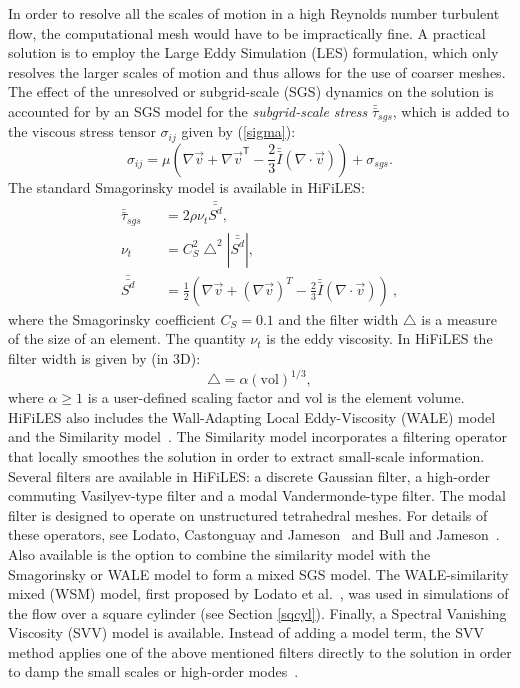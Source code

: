 In order to resolve all the scales of motion in a high Reynolds number turbulent flow, the computational mesh would have to be impractically fine.
A practical solution is to employ the Large Eddy Simulation (LES) formulation, which only resolves the larger scales of motion and thus allows for the use of coarser meshes.
The effect of the unresolved or subgrid-scale (SGS) dynamics on the solution is accounted for by an SGS model for the \emph{subgrid-scale stress} $\bar{\bar{\tau}}_{sgs}$, which is added to the viscous stress tensor $\sigma_{ij}$ given by (\ref{sigma}):
%
\begin{equation}\label{tausgs}
\sigma_{ij} = \mu \left ( \nabla \vec{v} + {\nabla \vec{v}}^\mathsf{T}  - \frac{2}{3} \bar{\bar{I}} (\nabla \cdot \vec{v} ) \right ) + \sigma_{sgs}.
\end{equation}
%
The standard Smagorinsky model\cite{smagorinsky1963} is available in HiFiLES:
%
\begin{eqnarray}\label{smag}
\bar{\bar{\tau}}_{sgs} &&= 2 \rho \nu_t \bar{\bar{S^d}}, \\
\nu_t &&= C_S^2 \bigtriangleup^2 | \bar{\bar{S^d}} |,\\
\bar{\bar{S^d}} &&= \frac 1 2 \left (\nabla \vec v + (\nabla \vec v)^T - \frac 2 3 \bar{\bar{I}} (\nabla \cdot \vec{v} ) \right )\ ,
\end{eqnarray}
%
where the Smagorinsky coefficient $C_S = 0.1$ and the filter width $\bigtriangleup$ is a measure of the size of an element.
The quantity $\nu_t$ is the eddy viscosity.
In HiFiLES the filter width is given by (in 3D):
%
\begin{equation}
\bigtriangleup = \alpha (\text{vol})^{1/3},
\end{equation}
%
where $\alpha \geq 1$ is a user-defined scaling factor and vol is the element volume.
HiFiLES also includes the Wall-Adapting Local Eddy-Viscosity (WALE) model~\cite{nicoud1999} and the Similarity model~\cite{bardina1980}.
The Similarity model incorporates a filtering operator that locally smoothes the solution in order to extract small-scale information.
Several filters are available in HiFiLES: a discrete Gaussian filter\cite{lodato2012b}, a high-order commuting Vasilyev-type filter\cite{vasilyev1998,vasilyev2001} and a modal Vandermonde-type filter\cite{blackburn2003}.
The modal filter is designed to operate on unstructured tetrahedral meshes.
For details of these operators, see Lodato, Castonguay and Jameson~\cite{lodato2012b} and Bull and Jameson~\cite{bull2013a}.
Also available is the option to combine the similarity model with the Smagorinsky or WALE model to form a mixed SGS model.
The WALE-similarity mixed (WSM) model, first proposed by Lodato et al.~\cite{lodato2009}, was used in simulations of the flow over a square cylinder (see Section \ref{sqcyl}).
Finally, a Spectral Vanishing Viscosity (SVV) model is available.
Instead of adding a model term, the SVV method applies one of the above mentioned filters directly to the solution in order to damp the small scales or high-order modes~\cite{karamanos2000}.

